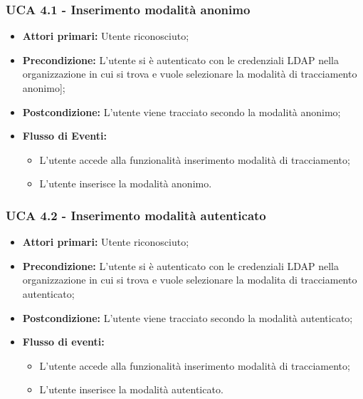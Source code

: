\subsubsection{UCA 4.1 - Inserimento modalità anonimo}%
\begin{itemize}
\item \textbf{Attori primari:} Utente riconosciuto;
\item \textbf{Precondizione:} L'utente si è autenticato con le credenziali LDAP nella organizzazione in cui si trova e vuole selezionare la modalità di tracciamento anonimo];
\item \textbf{Postcondizione:}  L'utente viene tracciato secondo la modalità anonimo;
\item \textbf{Flusso di Eventi:}
	\begin{itemize}
	\item L'utente accede alla funzionalità inserimento modalità di tracciamento; 
	\item L'utente inserisce la modalità anonimo.
\end{itemize}
\end{itemize}

\subsubsection{UCA 4.2 - Inserimento modalità autenticato}%
\begin{itemize}
	\item \textbf{Attori primari:} Utente riconosciuto;
	\item \textbf{Precondizione:} L'utente si è autenticato con le credenziali LDAP nella organizzazione in cui si trova e vuole selezionare la modalita di tracciamento autenticato;
	\item \textbf{Postcondizione:}  L'utente viene tracciato secondo la modalità autenticato;
	\item \textbf{Flusso di eventi:}
	\begin{itemize}
		\item L'utente accede alla funzionalità inserimento modalità di tracciamento;
		\item L'utente inserisce la modalità autenticato.
	\end{itemize}
\end{itemize}
